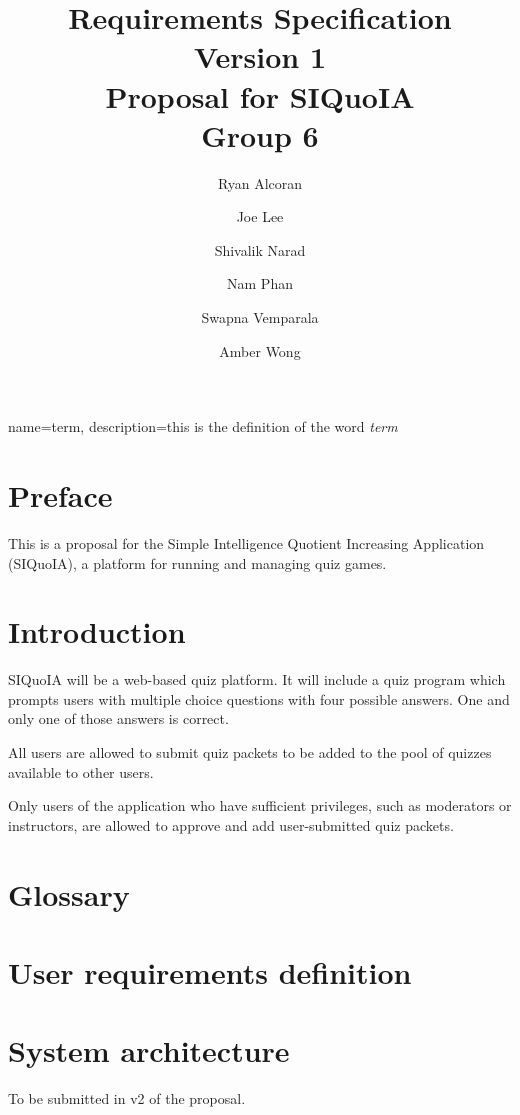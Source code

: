 \documentclass[12pt]{article}
\begin{document}
\title{Requirements Specification \\ {\large Version 1} \\[1em] {\large
    Proposal for SIQuoIA} \\[1em] Group 6}

\author{ Ryan Alcoran \and Joe Lee \and Shivalik Narad \and Nam Phan
  \and Swapna Vemparala \and Amber Wong }

\maketitle

{
  name=term,
  description={this is the definition of the word {\it term}}
}


\section{Preface}
This is a proposal for the Simple Intelligence Quotient Increasing
Application (SIQuoIA), a platform for running and managing quiz games.

\section{Introduction}
SIQuoIA will be a web-based quiz platform. It will include a quiz
program which prompts users with multiple choice questions with four
possible answers. One and only one of those answers is correct. 

All users are allowed to submit quiz packets to be added to the pool
of quizzes available to other users.

Only users of the application who have sufficient privileges, such as
moderators or instructors, are allowed to approve and add
user-submitted quiz packets.

\section{Glossary}
\printglossaries

\section{User requirements definition}


\section{System architecture}
To be submitted in v2 of the proposal.
\end{document}
